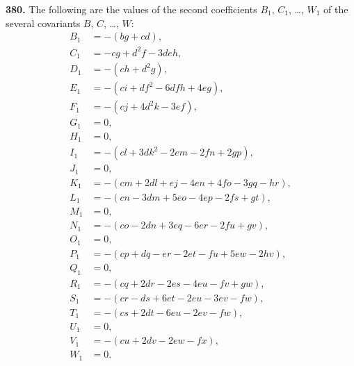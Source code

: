 \documentclass[12pt,a4paper]{article}
\begin{document}
\noindent\textbf{380.} The following are the values of the second coefficients $B_1$, $C_1$, \ldots, $W_1$ of the several covariants $B$, $C$, \ldots, $W$:
\begin{align*}
B_1 &= -(bg + cd), \\
C_1 &= -cg + d^2 f - 3deh, \\
D_1 &= -(ch + d^2 g), \\
E_1 &= -(ci + df^2 - 6dfh + 4eg), \\
F_1 &= -(cj + 4d^2 k - 3ef), \\
G_1 &= 0, \\
H_1 &= 0, \\
I_1 &= -(cl + 3dk^2 - 2em - 2fn + 2gp), \\
J_1 &= 0, \\
K_1 &= -(cm + 2dl + ej - 4en + 4fo - 3gq - hr), \\
L_1 &= -(cn - 3dm + 5eo - 4ep - 2fs + gt), \\
M_1 &= 0, \\
N_1 &= -(co - 2dn + 3eq - 6er - 2fu + gv), \\
O_1 &= 0, \\
P_1 &= -(cp + dq - er - 2et - fu + 5ew - 2hv), \\
Q_1 &= 0, \\
R_1 &= -(cq + 2dr - 2es - 4eu - fv + gw), \\
S_1 &= -(cr - ds + 6et - 2eu - 3ev - fw), \\
T_1 &= -(cs + 2dt - 6eu - 2ev - fw), \\
U_1 &= 0, \\
V_1 &= -(cu + 2dv - 2ew - fx), \\
W_1 &= 0.
\end{align*}

\medskip
\end{document}
